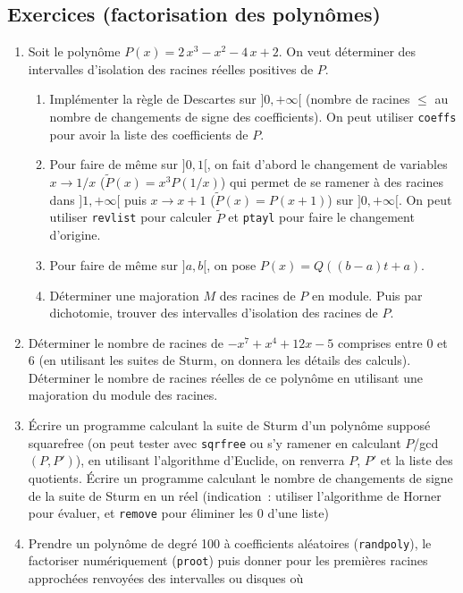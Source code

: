 \documentclass[a4paper,11pt]{book}
\begin{document}
\begin{giacjshere}
\section{Exercices (factorisation des polynômes)}
\begin{enumerate}
\item Soit le polyn\^ome $P(x)=2\,x^{3}-x^{2}-4\,x+2$.
On veut d\'eterminer des intervalles d'isolation des racines r\'eelles
positives de $P$.
\begin{enumerate} 
\item Impl\'ementer la r\`egle de Descartes sur $]0,+\infty[$
(nombre de racines $\leq$ au nombre de changements de signe des
coefficients). On peut utiliser \verb|coeffs| pour avoir la
liste des coefficients de $P$.
\item Pour faire de m\^eme sur $]0,1[$, on fait d'abord
le changement de variables $x\rightarrow 1/x$ 
($\tilde{P}(x)=x^3P(1/x)$) qui permet
de se ramener \`a des racines dans $]1,+\infty[$ puis  
$x \rightarrow x+1$ ($\tilde{P}(x)=P(x+1)$) sur $]0,+\infty[$.
On peut utiliser \verb|revlist| pour calculer $\tilde{P}$
et \verb|ptayl| pour faire le changement d'origine.
\item Pour faire de m\^eme sur $]a,b[$, on pose $P(x)=Q((b-a)t+a)$.
\item D\'eterminer une majoration $M$ des racines de $P$ en module.
Puis par dichotomie, trouver des intervalles d'isolation
des racines de $P$.
\end{enumerate}
\item Déterminer le nombre de racines de $-x^7+x^4+12x-5$ comprises
entre 0 et 6 (en utilisant les suites de Sturm, on donnera les
d\'etails des calculs). D\'eterminer le nombre de racines r\'eelles
de ce polyn\^ome en utilisant une majoration du module des racines.
\item \'Ecrire un programme calculant la suite de Sturm d'un polynôme
supposé squarefree (on peut tester avec \verb|sqrfree|
ou s'y ramener en calculant $P$/gcd$(P,P')$), en utilisant
l'algorithme d'Euclide, on renverra $P$, $P'$ et la liste des quotients.
\'Ecrire un programme calculant le nombre de changements de signe
de la suite de Sturm en un r\'eel (indication~: utiliser 
l'algorithme de Horner pour \'evaluer, 
et \verb|remove| pour \'eliminer les 0 d'une liste)
\item Prendre un polyn\^ome de degr\'e 100 \`a coefficients
al\'eatoires (\verb|randpoly|), le factoriser num\'eriquement
(\verb|proot|) puis donner pour les premi\`eres racines
approch\'ees renvoy\'ees des intervalles ou disques o\`u

\end{enumerate}
\end{giacjshere}
\end{document}
